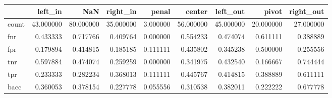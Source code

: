 \begin{tabular}{lrrrrrrrr}
\toprule
{} &    left\_in &        NaN &   right\_in &     penal &     center &   left\_out &      pivot &  right\_out \\
\midrule
count &  43.000000 &  80.000000 &  35.000000 &  3.000000 &  56.000000 &  45.000000 &  20.000000 &  27.000000 \\
fnr   &   0.433333 &   0.717766 &   0.409764 &  0.000000 &   0.554233 &   0.474074 &   0.611111 &   0.388889 \\
fpr   &   0.179894 &   0.414815 &   0.185185 &  0.111111 &   0.435802 &   0.345238 &   0.500000 &   0.255556 \\
tnr   &   0.597884 &   0.474074 &   0.259259 &  0.000000 &   0.341975 &   0.432540 &   0.166667 &   0.744444 \\
tpr   &   0.233333 &   0.282234 &   0.368013 &  0.111111 &   0.445767 &   0.414815 &   0.388889 &   0.611111 \\
bacc  &   0.360053 &   0.378154 &   0.227778 &  0.055556 &   0.310538 &   0.382011 &   0.222222 &   0.677778 \\
\bottomrule
\end{tabular}
